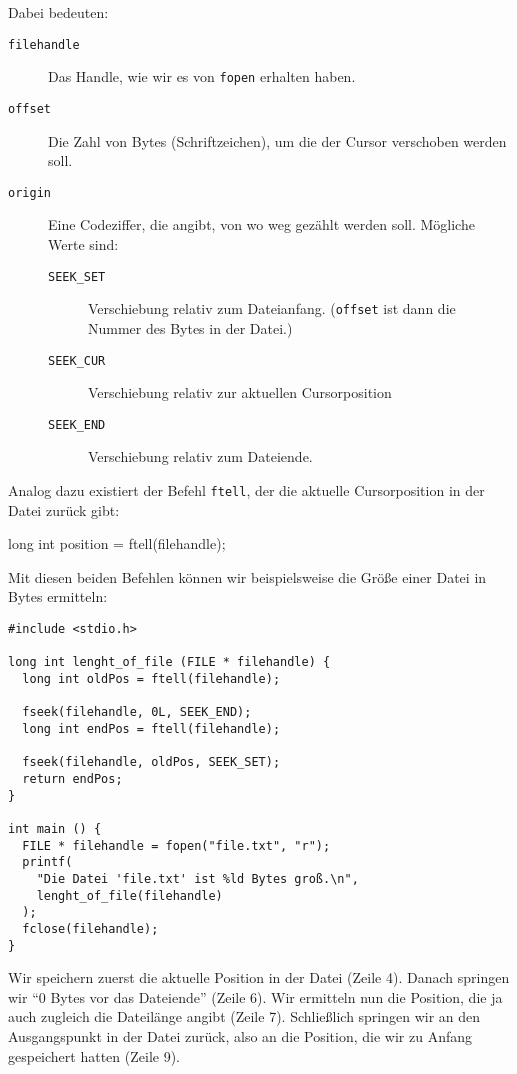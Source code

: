Dabei bedeuten:
\begin{description}
\item[\texttt{filehandle}] Das Handle, wie wir es von \texttt{fopen} erhalten haben.
\item[\texttt{offset}] Die Zahl von Bytes (\ie Schriftzeichen), um die der Cursor verschoben werden soll.
\item[\texttt{origin}] Eine Codeziffer, die angibt, von wo weg gezählt werden soll. Mögliche Werte sind:
	\begin{description}
	\item[\texttt{SEEK\_SET}] Verschiebung relativ zum Dateianfang. (\texttt{offset} ist dann die Nummer
		 des Bytes in der Datei.)
	\item[\texttt{SEEK\_CUR}] Verschiebung relativ zur aktuellen Cursorposition
	\item[\texttt{SEEK\_END}] Verschiebung relativ zum Dateiende.
	\end{description}
\end{description}

Analog dazu existiert der Befehl \texttt{ftell}, der die aktuelle Cursorposition in der Datei zurück gibt:
\begin{codebox}
long int position = ftell(filehandle);
\end{codebox}

Mit diesen beiden Befehlen können wir beispielsweise die Größe einer Datei in Bytes ermitteln:

\begin{codebox}
\begin{verbatim}
#include <stdio.h>

long int lenght_of_file (FILE * filehandle) {
  long int oldPos = ftell(filehandle);
  
  fseek(filehandle, 0L, SEEK_END);
  long int endPos = ftell(filehandle);
  
  fseek(filehandle, oldPos, SEEK_SET);
  return endPos;
}

int main () {
  FILE * filehandle = fopen("file.txt", "r");
  printf(
    "Die Datei 'file.txt' ist %ld Bytes groß.\n", 
    lenght_of_file(filehandle)
  );
  fclose(filehandle);
}
\end{verbatim}
\end{codebox}

Wir speichern zuerst die aktuelle Position in der Datei (Zeile 4). Danach springen wir \enquote{0 Bytes vor das Dateiende} (Zeile 6). Wir ermitteln nun die Position, die ja auch zugleich die Dateilänge angibt (Zeile 7). Schließlich springen wir an den Ausgangspunkt in der Datei zurück, also an die Position, die wir zu Anfang gespeichert hatten (Zeile 9).


